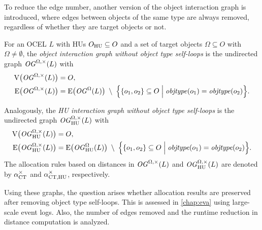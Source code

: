 To reduce the edge number, another version of the object interaction graph is introduced, where edges between objects of the same type are always removed, regardless of whether they are target objects or not.

\begin{definition}
  For an OCEL $L$ with HUs $O_{\mathrm{HU}}\subseteq O$ and a set of target objects $\Omega\subseteq O$ with $\Omega\neq\emptyset$,
  the \textit{object interaction graph without object type self-loops} is the undirected graph
  $\mathit{OG}^{\Omega,\times}(L)$ with
  \begin{align*}
    \operatorname{V}\bigl(\mathit{OG}^{\Omega,\times}(L)\bigr) &= O, \\
    \operatorname{E}\bigl(\mathit{OG}^{\Omega,\times}(L)\bigr) &=
      \operatorname{E}\bigl(\mathit{OG}^\Omega(L)\bigr)
      \;\setminus\;
      \Bigl\{ \{o_1,o_2\} \subseteq O \Bigm| \mathit{objtype}(o_1) = \mathit{objtype}(o_2) \Bigr\}.
  \end{align*}

  Analogously, the \textit{HU interaction graph without object type self-loops} is the undirected graph
  $\mathit{OG}_{\text{HU}}^{\Omega,\times}(L)$ with
  \begin{align*}
    \operatorname{V}\bigl(\mathit{OG}_{\text{HU}}^{\Omega,\times}(L)\bigr) &= O, \\
    \operatorname{E}\bigl(\mathit{OG}_{\text{HU}}^{\Omega,\times}(L)\bigr) &=
      \operatorname{E}\bigl(\mathit{OG}_{\text{HU}}^\Omega(L)\bigr)
      \;\setminus\;
      \Bigl\{ \{o_1,o_2\} \subseteq O \Bigm| \mathit{objtype}(o_1) = \mathit{objtype}(o_2) \Bigr\}.
  \end{align*}
  The  allocation rules based on distances in $\mathit{OG}^{\Omega,\times}(L)$ and $\mathit{OG}_{\text{HU}}^{\Omega,\times}(L)$ are denoted by $\alpha_\text{CT}^{\times}$ and $\alpha_\text{CT,HU}^{\times}$, respectively.
  \label{def:og-wo-ot-loops}
\end{definition}

Using these graphs, the question arises whether allocation results are preserved after removing object type self-loops.
This is assessed in \autoref{chap:eva} using large-scale event logs.
Also, the number of edges removed and the runtime reduction in distance computation is analyzed.

